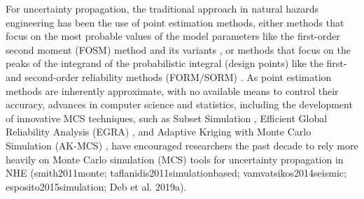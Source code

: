For uncertainty propagation, the traditional approach in natural hazards engineering has been the use of point estimation methods, either methods that focus on the most probable values of the model parameters like the first-order second moment (FOSM) method \citep{baker2008uncertainty} and its variants \citep{vamvatsikos2013derivation}, or methods that focus on the peaks of the integrand of the probabilistic integral (design points) like the first- and second-order reliability methods (FORM/SORM) \citep{koduru2010feasibility}. As point estimation methods are inherently approximate, with no available means to control their accuracy, advances in computer science and statistics, including the development of innovative MCS techniques, such as Subset Simulation \citep{au2003subset}, Efficient Global Reliability Analysis (EGRA) \citep{bichon2013efficient}, and Adaptive Kriging with Monte Carlo Simulation (AK-MCS) \citep{echard2011akmcs}, have encouraged researchers the past decade to rely more heavily on Monte Carlo simulation (MCS) tools for uncertainty propagation in NHE (smith2011monte; taflanidis2011simulationbased; vamvatsikos2014seismic; esposito2015simulation; Deb et al. 2019a). 

